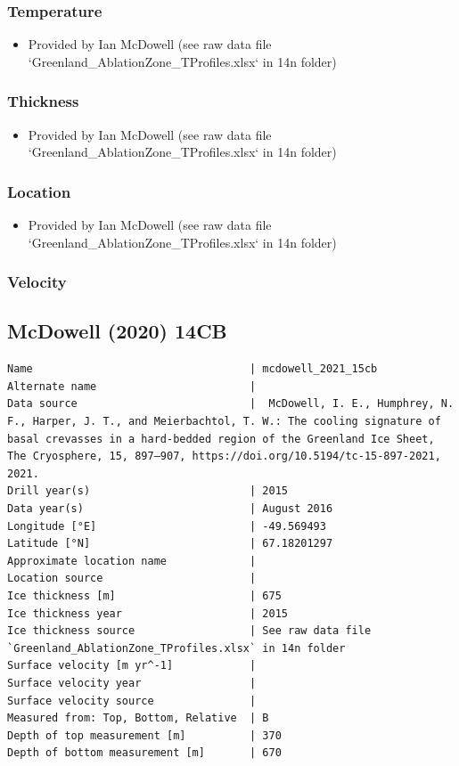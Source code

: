 \documentclass[article,a4paper,times,11pt,twoside]{article}
\begin{document}
\subsubsection{Temperature}
\label{sec:org9ab2ab6}

\begin{itemize}
\item Provided by Ian McDowell (see raw data file `Greenland\_AblationZone\_TProfiles.xlsx` in 14n folder)
\end{itemize}

\subsubsection{Thickness}
\label{sec:orgc4900fa}

\begin{itemize}
\item Provided by Ian McDowell (see raw data file `Greenland\_AblationZone\_TProfiles.xlsx` in 14n folder)
\end{itemize}

\subsubsection{Location}
\label{sec:orgf3ecb2e}

\begin{itemize}
\item Provided by Ian McDowell (see raw data file `Greenland\_AblationZone\_TProfiles.xlsx` in 14n folder)
\end{itemize}

\subsubsection{Velocity}
\label{sec:org2ff19ad}
\clearpage
\subsection{McDowell (2020) 14CB}
\label{sec:orge677acb}
\begin{verbatim}
Name                                  | mcdowell_2021_15cb
Alternate name                        | 
Data source                           |  McDowell, I. E., Humphrey, N. F., Harper, J. T., and Meierbachtol, T. W.: The cooling signature of basal crevasses in a hard-bedded region of the Greenland Ice Sheet, The Cryosphere, 15, 897–907, https://doi.org/10.5194/tc-15-897-2021, 2021.
Drill year(s)                         | 2015
Data year(s)                          | August 2016
Longitude [°E]                        | -49.569493
Latitude [°N]                         | 67.18201297
Approximate location name             | 
Location source                       | 
Ice thickness [m]                     | 675
Ice thickness year                    | 2015
Ice thickness source                  | See raw data file `Greenland_AblationZone_TProfiles.xlsx` in 14n folder
Surface velocity [m yr^-1]            | 
Surface velocity year                 | 
Surface velocity source               | 
Measured from: Top, Bottom, Relative  | B
Depth of top measurement [m]          | 370
Depth of bottom measurement [m]       | 670
\end{verbatim}
\end{document}
